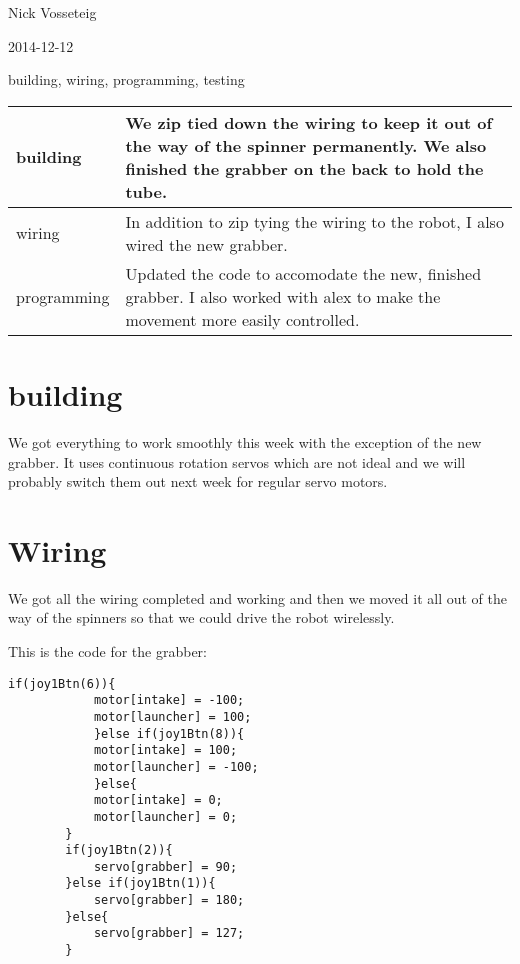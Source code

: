 Nick Vosseteig

2014-12-12

building, wiring, programming, testing

\begin{tabular}{|p{5cm}|p{5cm}|}
 \hline
 building&
We zip tied down the wiring to keep it out of the way of the spinner permanently. We also finished the grabber on the back to hold the tube. 
 \\
 \hline
wiring&
In addition to zip tying the wiring to the robot, I also wired the new grabber. 
 \\
 \hline
programming&
Updated the code to accomodate the new, finished grabber. I also worked with alex to make the movement more easily controlled.
 \\
 \hline
\end{tabular}

\section*{building}
We got everything to work smoothly this week with the exception of the new grabber. It uses continuous rotation servos which are not ideal and we will probably switch them out next week for regular servo motors.
\section*{Wiring}
We got all the wiring completed and working and then we moved it all out of the way of the spinners so that we could drive the robot wirelessly.

This is the code for the grabber:
\begin{lstlisting}[style = RobotC]	
		if(joy1Btn(6)){
			motor[intake] = -100;
			motor[launcher] = 100;
			}else if(joy1Btn(8)){
			motor[intake] = 100;
			motor[launcher] = -100;
			}else{
			motor[intake] = 0;
			motor[launcher] = 0;
		}
		if(joy1Btn(2)){
			servo[grabber] = 90;
		}else if(joy1Btn(1)){
			servo[grabber] = 180;
		}else{
			servo[grabber] = 127;
		}
\end{lstlisting}
